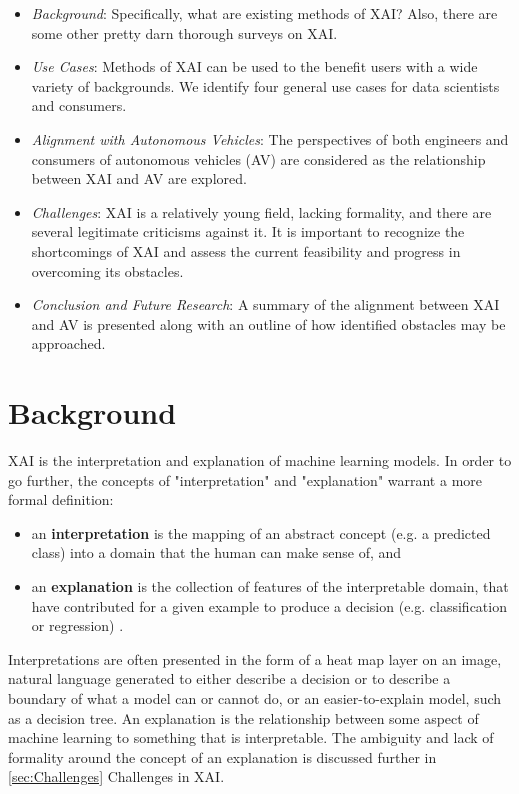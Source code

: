 \documentclass{IEEEtran}
\begin{document}
\begin{itemize}
    \item\textit{Background}: Specifically, what are existing methods of XAI?  Also, there are some other pretty darn thorough surveys on XAI.

    \item\textit{Use Cases}: Methods of XAI can be used to the benefit users with a wide variety of backgrounds.  We identify four general use cases for data scientists and consumers.

    \item\textit{Alignment with Autonomous Vehicles}: The perspectives of both engineers and consumers of autonomous vehicles (AV) are considered as the relationship between XAI and AV are explored.

    \item\textit{Challenges}: XAI is a relatively young field, lacking formality, and there are several legitimate criticisms against it.  It is important to recognize the shortcomings of XAI and assess the current feasibility and progress in overcoming its obstacles.

    \item\textit{Conclusion and Future Research}: A summary of the alignment between XAI and AV is presented along with an outline of how identified obstacles may be approached.
\end{itemize}

\section{Background}

XAI is the interpretation and explanation of machine learning models.  In order to go further, the concepts of "interpretation" and "explanation" warrant a more formal definition:

\begin{itemize}
    \item an \textbf{interpretation} is the mapping of an abstract concept (e.g. a predicted class) into a domain that the human can make sense of, and
    \item an \textbf{explanation} is the collection of features of the interpretable domain, that have contributed for a given example to produce a decision (e.g. classification or regression) \cite{MONTAVON20181}.
\end{itemize}

Interpretations are often presented in the form of a heat map layer on an image, natural language generated to either describe a decision or to describe a boundary of what a model can or cannot do, or an easier-to-explain model, such as a decision tree.  An explanation is the relationship between some aspect of machine learning to something that is interpretable.  The ambiguity and lack of formality around the concept of an explanation is discussed further in \ref{sec:Challenges} Challenges in XAI.
\end{document}

